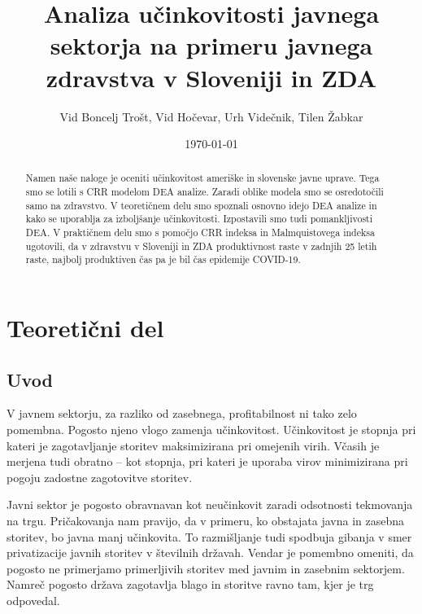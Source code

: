\documentclass[12pt,a4paper]{article}
\theoremstyle{definition}
\begin{document}
\setlength{\parskip}{1em}
\setlength{\parindent}{0pt}

\title{Analiza učinkovitosti javnega sektorja na primeru javnega zdravstva v Sloveniji in ZDA}
\author{Vid Boncelj Trošt, Vid Hočevar, Urh Videčnik, Tilen Žabkar}
\date{\today}
\maketitle

\begin{abstract}
    Namen naše naloge je oceniti učinkovitost ameriške in slovenske javne
    uprave. Tega smo se lotili s CRR modelom DEA analize. Zaradi oblike modela
    smo se osredotočili samo na zdravstvo. V teoretičnem
    delu smo spoznali osnovno idejo DEA analize in kako se uporablja za 
    izboljšanje učinkovitosti. Izpostavili smo tudi pomankljivosti DEA. 
    V praktičnem delu smo s pomočjo CRR indeksa in Malmquistovega indeksa
    ugotovili, da v zdravstvu v Sloveniji in ZDA produktivnost raste v zadnjih
    25 letih raste, najbolj produktiven čas pa je bil čas epidemije COVID-19. 
\end{abstract}

\newpage

\tableofcontents

\section{Teoretični del}

\subsection{Uvod}

V javnem sektorju, za razliko od zasebnega, profitabilnost
ni tako zelo pomembna. Pogosto njeno vlogo zamenja učinkovitost. 
Učinkovitost je stopnja pri kateri je zagotavljanje storitev maksimizirana pri omejenih 
virih. Včasih je merjena tudi obratno -- kot stopnja, pri kateri je uporaba virov 
minimizirana pri pogoju zadostne zagotovitve storitev. 

Javni sektor je pogosto obravnavan kot neučinkovit zaradi odsotnosti
tekmovanja na trgu. Pričakovanja nam pravijo, da v primeru, ko obstajata
javna in zasebna storitev, bo javna manj učinkovita. To razmišljanje tudi
spodbuja gibanja v smer privatizacije javnih storitev v številnih državah.
Vendar je pomembno omeniti, da pogosto ne primerjamo primerljivih
storitev med javnim in zasebnim sektorjem. Namreč 
pogosto država zagotavlja blago in storitve ravno tam, kjer je trg odpovedal.
\cite{Lovell2002}
\end{document}
